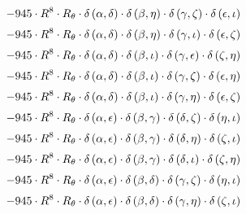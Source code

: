 \begin{subequations}
\begin{gather}
 \\[0.2em] \notag 		 - 945 \cdot R^{8} \cdot R_{\theta{}} \cdot \delta{}\left(\alpha{}, \delta{}\right) \cdot \delta{}\left(\beta{}, \eta{}\right) \cdot \delta{}\left(\gamma{}, \zeta{}\right) \cdot \delta{}\left(\epsilon{}, \iota{}\right) 
 \\[0.2em] \notag 		 - 945 \cdot R^{8} \cdot R_{\theta{}} \cdot \delta{}\left(\alpha{}, \delta{}\right) \cdot \delta{}\left(\beta{}, \eta{}\right) \cdot \delta{}\left(\gamma{}, \iota{}\right) \cdot \delta{}\left(\epsilon{}, \zeta{}\right) 
 \\[0.2em] \notag 		 - 945 \cdot R^{8} \cdot R_{\theta{}} \cdot \delta{}\left(\alpha{}, \delta{}\right) \cdot \delta{}\left(\beta{}, \iota{}\right) \cdot \delta{}\left(\gamma{}, \epsilon{}\right) \cdot \delta{}\left(\zeta{}, \eta{}\right) 
 \\[0.2em] \notag 		 - 945 \cdot R^{8} \cdot R_{\theta{}} \cdot \delta{}\left(\alpha{}, \delta{}\right) \cdot \delta{}\left(\beta{}, \iota{}\right) \cdot \delta{}\left(\gamma{}, \zeta{}\right) \cdot \delta{}\left(\epsilon{}, \eta{}\right) 
 \\[0.2em] \notag 		 - 945 \cdot R^{8} \cdot R_{\theta{}} \cdot \delta{}\left(\alpha{}, \delta{}\right) \cdot \delta{}\left(\beta{}, \iota{}\right) \cdot \delta{}\left(\gamma{}, \eta{}\right) \cdot \delta{}\left(\epsilon{}, \zeta{}\right) 
 \\[0.2em] \notag 		 - 945 \cdot R^{8} \cdot R_{\theta{}} \cdot \delta{}\left(\alpha{}, \epsilon{}\right) \cdot \delta{}\left(\beta{}, \gamma{}\right) \cdot \delta{}\left(\delta{}, \zeta{}\right) \cdot \delta{}\left(\eta{}, \iota{}\right) 
 \\[0.2em] \notag 		 - 945 \cdot R^{8} \cdot R_{\theta{}} \cdot \delta{}\left(\alpha{}, \epsilon{}\right) \cdot \delta{}\left(\beta{}, \gamma{}\right) \cdot \delta{}\left(\delta{}, \eta{}\right) \cdot \delta{}\left(\zeta{}, \iota{}\right) 
 \\[0.2em] \notag 		 - 945 \cdot R^{8} \cdot R_{\theta{}} \cdot \delta{}\left(\alpha{}, \epsilon{}\right) \cdot \delta{}\left(\beta{}, \gamma{}\right) \cdot \delta{}\left(\delta{}, \iota{}\right) \cdot \delta{}\left(\zeta{}, \eta{}\right) 
 \\[0.2em] \notag 		 - 945 \cdot R^{8} \cdot R_{\theta{}} \cdot \delta{}\left(\alpha{}, \epsilon{}\right) \cdot \delta{}\left(\beta{}, \delta{}\right) \cdot \delta{}\left(\gamma{}, \zeta{}\right) \cdot \delta{}\left(\eta{}, \iota{}\right) 
 \\[0.2em] \notag 		 - 945 \cdot R^{8} \cdot R_{\theta{}} \cdot \delta{}\left(\alpha{}, \epsilon{}\right) \cdot \delta{}\left(\beta{}, \delta{}\right) \cdot \delta{}\left(\gamma{}, \eta{}\right) \cdot \delta{}\left(\zeta{}, \iota{}\right) 

\end{gather}
\end{subequations}
